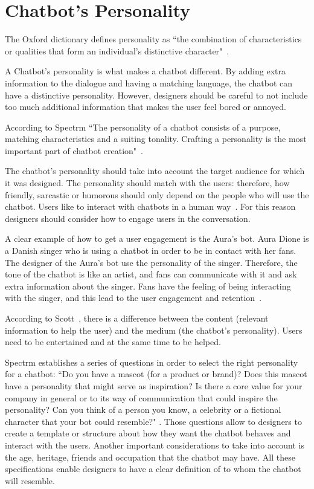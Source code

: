 \documentclass[a4paper,10pt]{article}
\begin{document}
\section{Chatbot's Personality}

The Oxford dictionary defines personality as ``the combination of characteristics or qualities that form an individual's distinctive character"~\cite{Oxford}.

A Chatbot’s personality is what makes a chatbot different. By adding extra information to the dialogue and having a matching language, the chatbot can have a distinctive personality. However, designers should be careful to not include too much additional information that makes the user feel bored or annoyed. 

According to Spectrm ``The personality of a chatbot consists of a purpose, matching characteristics and a suiting tonality. Crafting a personality is the most important part of chatbot creation"~\cite{personality}.

The chatbot’s personality should take into account the target audience for which it was designed. The personality should match with the users: therefore, how friendly, sarcastic or humorous should only depend on the people who will use the chatbot. Users like to interact with chatbots in a human way~\cite{HeuristicsWebPage}. For this reason designers should consider how to engage users in the conversation. 

A clear example of how to get a user engagement is the Aura's bot. Aura Dione is a Danish singer who is using a chatbot in order to be in contact with her fans. The designer of the Aura's bot use the personality of the singer. Therefore, the tone of the chatbot is like an artist, and fans can communicate with it and ask extra information about the singer. Fans have the feeling of being interacting with the singer, and this lead to the user engagement and retention~\cite{personality}.  

According to Scott~\cite{HeuristicsWebPage}, there is a difference between the content (relevant information to help the user) and the medium (the chatbot’s personality). Users need to be entertained and at the same time to be helped.      

Spectrm establishes a series of questions in order to select the right personality for a chatbot: ``Do you have a mascot (for a product or brand)? Does this mascot have a personality that might serve as inspiration? Is there a core value for your company in general or to its way of communication that could inspire the personality? Can you think of a person you know, a celebrity or a fictional character that your bot could resemble?" \cite{personality}. Those questions allow to designers to create a template or structure about how they want the chatbot behaves and interact with the users. Another important considerations to take into account is the age, heritage, friends and occupation that the chatbot may have. All these specifications enable designers to have a clear definition of to whom the chatbot will resemble.
\end{document}
